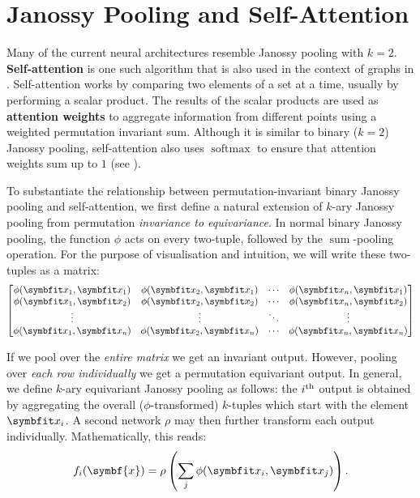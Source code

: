 \section{Janossy Pooling and Self-Attention}\label{sec:jan-attn}

Many of the current neural architectures resemble Janossy pooling with $k=2$.
\textbf{Self-attention} \parencite{vaswani2017attention} is one such algorithm that is also used in the context of graphs in \samptr. Self-attention works by comparing two elements of a set at a time, usually by performing a scalar product.
The results of the scalar products are used as \textbf{attention weights} to aggregate information from different points using a weighted permutation invariant sum. Although it is similar to binary ($k=2$) Janossy pooling, self-attention also uses $\operatorname{softmax}$ to ensure that attention weights sum up to $1$ (see ).

To substantiate the relationship between permutation-invariant binary Janossy pooling and self-attention, we first define a natural extension of $k$-ary Janossy pooling from permutation \textit{invariance to equivariance}. In normal binary Janossy pooling, the function $\phi$ acts on every two-tuple, followed by the $\operatorname{sum}$-pooling operation. For the purpose of visualisation and intuition, we will write these two-tuples as a matrix:
\begin{equation}
    \begin{bmatrix}
    \phi(\bfitx_1, \bfitx_1) & \phi(\bfitx_2, \bfitx_1) & \cdots & \phi(\bfitx_n, \bfitx_1) \\
    \phi(\bfitx_1, \bfitx_2) & \phi(\bfitx_2, \bfitx_2) & \cdots & \phi(\bfitx_n, \bfitx_2) \\
    \vdots                   &  \vdots              & \ddots & \vdots         \\
    \phi(\bfitx_1, \bfitx_n) & \phi(\bfitx_2, \bfitx_n) & \cdots & \phi(\bfitx_n, \bfitx_n)
    \end{bmatrix}
    \label{eqn:jan-attn-matrix}
\end{equation}

If we pool over the \textit{entire matrix} we get an invariant output. However, pooling over \textit{each row individually} we get a permutation equivariant output.
In general, we define $k$-ary equivariant Janossy pooling as follows: the $i\textsuperscript{th}$ output is obtained by aggregating the overall ($\phi$-transformed) $k$-tuples which start with the element $\bfitx_i$. A second network $\rho$ may then further transform each output individually. Mathematically, this reads:
\begin{equation}
    f_i(\symbf{x}) = \rho \left( \sum_j \phi(\bfitx_i, \bfitx_j) \right).
    \label{eqn:janossy-attention}
\end{equation}

